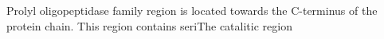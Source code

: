 Prolyl oligopeptidase family region is located towards the C-terminus of the protein chain. This region contains seriThe catalitic region 